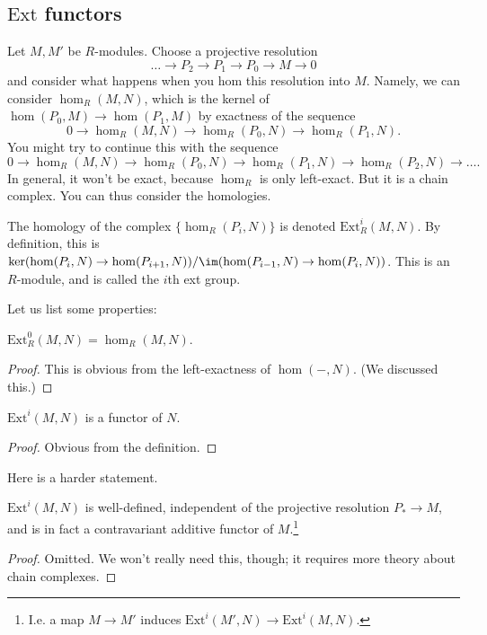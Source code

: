\newcommand{\ext}{\mathrm{Ext}}
\subsection{$\ext$ functors}

Let $M, M'$ be $R$-modules. Choose a projective resolution 
\[ \dots \to P_2 \to P_1 \to P_0 \to M \to 0  \]
and consider what happens when you hom this resolution into $M$. Namely, we can
consider $\hom_R(M,N)$, which is the kernel of $\hom(P_0, M) \to \hom(P_1, M) $
by exactness of the sequence
\[ 0 \to \hom_R(M,N) \to \hom_R(P_0, N) \to \hom_R(P_1, N) . \]
You might try to continue this with the sequence
\[ 0 \to \hom_R(M,N) \to \hom_R(P_0, N) \to \hom_R(P_1, N) \to \hom_R(P_2, N)
\to \dots. \]
In general, it won't be exact, because $\hom_R$ is only left-exact. But it is a
chain complex. You can thus consider the homologies.

\begin{definition} 
The homology of the complex $\{\hom_R(P_i, N)\}$ is denoted $\ext^i_R(M,N)$. By
definition, this is $\ker(\hom(P_i,N) \to \hom(P_{i+1}, N))/\im(\hom(P_{i-1},
N) \to \hom(P_i,N))$. This is an $R$-module, and is called the $i$th ext group.
\end{definition} 



Let us list some properties:

\begin{proposition} 
$\ext_R^0(M,N) = \hom_R(M,N)$. 
\end{proposition} 
\begin{proof} 
This is obvious from the left-exactness of $\hom(-,N)$. (We discussed this.)
\end{proof} 

\begin{proposition} 
$\ext^i(M,N)$ is a functor of $N$.
\end{proposition} 
\begin{proof} 
Obvious from the definition.
\end{proof} 

Here is a harder statement.
\begin{proposition} 
$\ext^i(M,N)$ is well-defined, independent of the projective resolution $P_*
\to M$, and is in fact a contravariant additive functor of $M$.\footnote{I.e. a map $M
\to M'$ induces $\ext^i(M', N) \to \ext^i(M,N)$.}
\end{proposition} 
\begin{proof} 
Omitted. We won't really need this, though; it requires more theory about
chain complexes.
\end{proof} 


